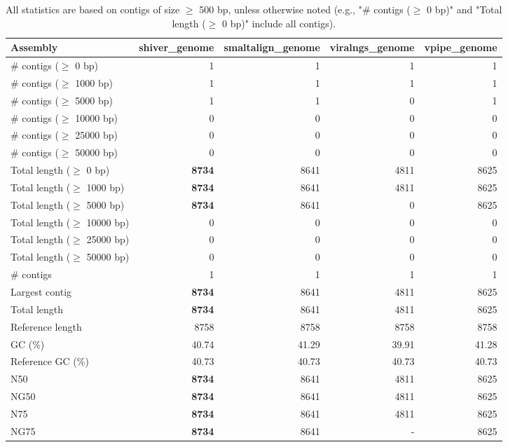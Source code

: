 \documentclass[12pt,a4paper]{article}
\begin{document}
\begin{table}[ht]
\begin{center}
\caption{All statistics are based on contigs of size $\geq$ 500 bp, unless otherwise noted (e.g., "\# contigs ($\geq$ 0 bp)" and "Total length ($\geq$ 0 bp)" include all contigs).}
\begin{tabular}{|l*{4}{|r}|}
\hline
Assembly & shiver\_genome & smaltalign\_genome & viralngs\_genome & vpipe\_genome \\ \hline
\# contigs ($\geq$ 0 bp) & 1 & 1 & 1 & 1 \\ \hline
\# contigs ($\geq$ 1000 bp) & 1 & 1 & 1 & 1 \\ \hline
\# contigs ($\geq$ 5000 bp) & 1 & 1 & 0 & 1 \\ \hline
\# contigs ($\geq$ 10000 bp) & 0 & 0 & 0 & 0 \\ \hline
\# contigs ($\geq$ 25000 bp) & 0 & 0 & 0 & 0 \\ \hline
\# contigs ($\geq$ 50000 bp) & 0 & 0 & 0 & 0 \\ \hline
Total length ($\geq$ 0 bp) & {\bf 8734} & 8641 & 4811 & 8625 \\ \hline
Total length ($\geq$ 1000 bp) & {\bf 8734} & 8641 & 4811 & 8625 \\ \hline
Total length ($\geq$ 5000 bp) & {\bf 8734} & 8641 & 0 & 8625 \\ \hline
Total length ($\geq$ 10000 bp) & 0 & 0 & 0 & 0 \\ \hline
Total length ($\geq$ 25000 bp) & 0 & 0 & 0 & 0 \\ \hline
Total length ($\geq$ 50000 bp) & 0 & 0 & 0 & 0 \\ \hline
\# contigs & 1 & 1 & 1 & 1 \\ \hline
Largest contig & {\bf 8734} & 8641 & 4811 & 8625 \\ \hline
Total length & {\bf 8734} & 8641 & 4811 & 8625 \\ \hline
Reference length & 8758 & 8758 & 8758 & 8758 \\ \hline
GC (\%) & 40.74 & 41.29 & 39.91 & 41.28 \\ \hline
Reference GC (\%) & 40.73 & 40.73 & 40.73 & 40.73 \\ \hline
N50 & {\bf 8734} & 8641 & 4811 & 8625 \\ \hline
NG50 & {\bf 8734} & 8641 & 4811 & 8625 \\ \hline
N75 & {\bf 8734} & 8641 & 4811 & 8625 \\ \hline
NG75 & {\bf 8734} & 8641 & - & 8625 \\ \hline

\end{tabular}
\end{center}
\end{table}
\end{document}
